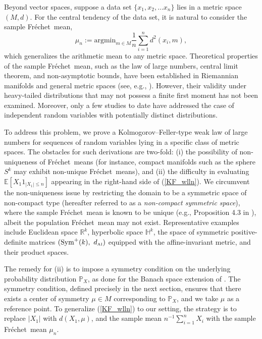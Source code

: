 \documentclass[preprint]{imsart}
\def\Frechet{Fr\'{e}chet}
\theoremstyle{plain}
\theoremstyle{remark}
\begin{document}
Beyond vector spaces, suppose a data set $\{x_1, x_2, \ldots x_n\}$ lies in a metric space $(M,d)$. For the central tendency of the data set, it is natural to consider the sample \Frechet\ mean, $$\mu_n:=\mbox{argmin}_{m\in M} \frac{1}{n} \sum_{i=1}^{n}d^2(x_i, m),$$ which generalizes the arithmetic mean to any metric space.
Theoretical properties of the sample \Frechet\ mean, such as the law of large numbers, central limit theorem, and non-asymptotic bounds, have been established in Riemannian manifolds and general metric spaces (see, e.g., \cite{ziezold1977expected, sturm2003probability, bhattacharya2003large, schotz2022strong, evans2024limit, brunel2024concentration, schotz2025variance, brunel2025finite}). However, their validity under heavy-tailed distributions that may not possess a finite first moment has not been examined. Moreover, only a few studies to date \citep[e.g.,][]{brunel2024concentration, brunel2025finite} have addressed the case of independent random variables with potentially distinct distributions.


To address this problem, we prove a %
Kolmogorov--Feller-type weak law of large numbers 
for sequences of random variables lying in a specific class of metric spaces. The obstacles for such derivations are two-fold: (i) the possibility of non-uniqueness of \Frechet\ means (for instance, compact manifolds such as the sphere $S^k$ may exhibit non-unique \Frechet\ means), and (ii) the difficulty in evaluating $\mathbb{E}[X_{1}1_{|X_1|\le n}]$ appearing in the right-hand side of (\ref{KF_wlln}). 
We circumvent the non-uniqueness issue by restricting the domain to be a symmetric space of non-compact type (hereafter referred to as a \textit{non-compact symmetric space}), where the sample \Frechet\ mean is known to be unique (e.g., Proposition 4.3 in \cite{sturm2003probability}), albeit the population \Frechet\ mean may not exist. 
Representative examples include Euclidean space $\mathbb{R}^k$, hyperbolic space $\mathbb{H}^{k}$, the space of symmetric positive-definite matrices $(\text{Sym}^{+}(k), ~ d_{\text{\tiny AI}})$ equipped with the affine-invariant metric, and their product spaces.

The remedy for (ii) is to impose a symmetry condition on the underlying probability distribution $\mathbb{P}_{X}$, as done for the Banach space extension of  \cite{marcus1979stable}.
The symmetry condition, defined precisely in the next section, ensures that there exists a center of symmetry $\mu \in M$ corresponding to $\mathbb{P}_{X}$, and we take $\mu$ as a reference point. To generalize (\ref{KF_wlln}) to our setting, the strategy is to replace $|X_1|$ with $d(X_1, \mu)$, and the sample mean $n^{-1}\sum_{i=1}^{n}X_i$ with the sample \Frechet\ mean $\mu_n$. 
\end{document}
